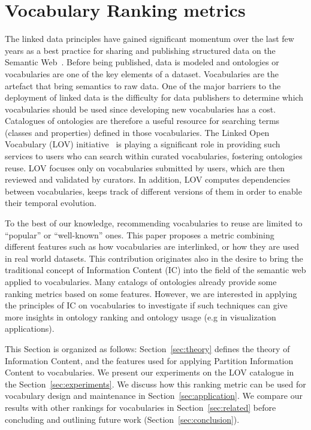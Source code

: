\section{Vocabulary Ranking metrics}
\label{sec:vocabranking}

\label{sec:introduction}
The linked data principles have gained significant momentum over the last few years as a best practice for sharing and publishing structured data on the Semantic Web~\cite{Bizer2009}. Before being published, data is modeled and ontologies or vocabularies are one of the key elements of a dataset. Vocabularies are the artefact that bring semantics to raw data. One of the major barriers to the deployment of linked data is the difficulty for data publishers to determine which vocabularies should be used since developing new vocabularies has a cost. Catalogues of ontologies are therefore a useful resource for searching terms (classes and properties) defined in those vocabularies. The Linked Open Vocabulary (LOV) initiative~\cite{scharffe_2012} is playing a significant role in providing such services to users who can search within curated vocabularies, fostering ontologies reuse. LOV focuses only on vocabularies submitted by users, which are then reviewed and validated by curators. In addition, LOV computes dependencies between vocabularies, keeps track of different versions of them in order to enable their temporal evolution.

To the best of our knowledge, recommending vocabularies to reuse are limited to ``popular'' or ``well-known'' ones. This paper proposes a metric combining different features such as how vocabularies are interlinked, or how they are used in real world datasets. This contribution originates also in the desire to bring the traditional concept of Information Content (IC) into the field of the semantic web applied to vocabularies. Many catalogs of ontologies already provide some ranking metrics based on some features. However, we are interested in applying the principles of IC on vocabularies to investigate if such techniques can give more insights in ontology ranking and ontology usage (e.g in visualization applications).

This Section is organized as follows: Section~\ref{sec:theory} defines the theory of Information Content, and the features used for applying Partition Information Content to vocabularies. We present our experiments on the LOV catalogue in the Section~\ref{sec:experiments}. We discuss how this ranking metric can be used for vocabulary design and maintenance in Section~\ref{sec:application}. We compare our results with other rankings for vocabularies in Section~\ref{sec:related} before concluding and outlining future work (Section~\ref{sec:conclusion}).



